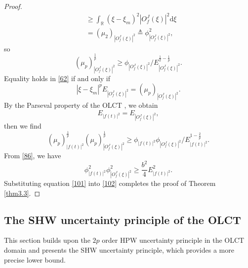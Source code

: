 \documentclass[preprint,12pt]{elsarticle}
\begin{document}
\begin{proof}
\begin{equation*}
\begin{aligned}
	&\ge \int_{\mathbb{R}} (\xi-\xi_m) ^2 \left| O_f^J(\xi) \right|^2 \mathrm{d}\xi\\
	&= (\mu_{2})_{\left| O_f^J(\xi) \right|^2} \triangleq \phi_{\left| O_f^J(\xi) \right|^2}^2,
	\end{aligned}	
	\end{equation*}
	so 
	\begin{equation}
	\label{62}
	(\mu_{p})_{\left| O_f^J(\xi) \right|^2}^{\frac{1}{p}} \ge  \phi_{\left| O_f^J(\xi) \right|^2} / E_{\left| O_f^J(\xi) \right|^2}^{\frac{1}{2}-\frac{1}{p}}.
	\end{equation}
	Equality holds in \eqref{62} if and only if
	\begin{equation*}
	\left| \xi-\xi_m \right|^{p} E_{\left| O_f^J(\xi) \right|^2} = (\mu_{p})_{\left| O_f^J(\xi) \right|^2}.
	\end{equation*}
	By the Parseval property of the OLCT \cite{OLCTP}, we obtain
	\begin{equation}
	E_{\left| f(t) \right|^2} = E_{\left| O_f^J(\xi) \right|^2},
	\end{equation}
	then we find
	\begin{equation}
	\label{102}
	(\mu_{p})_{\left| f(t) \right|^2}^{\frac{1}{p}} (\mu_{p})_{\left| O_f^J(\xi) \right|^2}^{\frac{1}{p}} \ge \phi_{\left|f(t) \right|^2} \phi_{\left| O_f^J(\xi) \right|^2} / E_{\left| f(t) \right|^2}^{1-\frac{2}{p}}.
	\end{equation}
	From \eqref{86}, we have
	\begin{equation}
	\label{101}
	\phi_{\left|f(t) \right|^2}^2 \phi_{\left| O_f^J(\xi) \right|^2}^2 \ge \frac{b^2}{4} E_{\left| f(t) \right|^2} ^2.
	\end{equation}
	Substituting equation \eqref{101} into \eqref{102} completes the proof of Theorem \ref{thm3.3}.
\end{proof}

\subsection{The SHW uncertainty principle of the OLCT}
This section builds upon the $2p$ order HPW uncertainty principle in the OLCT domain and presents the SHW uncertainty principle, which provides a more precise lower bound.
\end{document}
